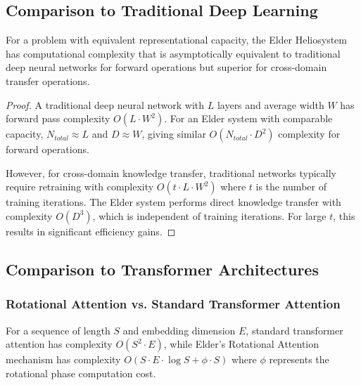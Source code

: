 \subsection{Comparison to Traditional Deep Learning}

\begin{theorem}
For a problem with equivalent representational capacity, the Elder Heliosystem has computational complexity that is asymptotically equivalent to traditional deep neural networks for forward operations but superior for cross-domain transfer operations.
\end{theorem}

\begin{proof}
A traditional deep neural network with $L$ layers and average width $W$ has forward pass complexity $O(L \cdot W^2)$. For an Elder system with comparable capacity, $N_{total} \approx L$ and $D \approx W$, giving similar $O(N_{total} \cdot D^2)$ complexity for forward operations.

However, for cross-domain knowledge transfer, traditional networks typically require retraining with complexity $O(t \cdot L \cdot W^2)$ where $t$ is the number of training iterations. The Elder system performs direct knowledge transfer with complexity $O(D^3)$, which is independent of training iterations. For large $t$, this results in significant efficiency gains.
\end{proof}

\subsection{Comparison to Transformer Architectures}

\subsubsection{Rotational Attention vs. Standard Transformer Attention}

\begin{theorem}
For a sequence of length $S$ and embedding dimension $E$, standard transformer attention has complexity $O(S^2 \cdot E)$, while Elder's Rotational Attention mechanism has complexity $O(S \cdot E \cdot \log S + \phi \cdot S)$ where $\phi$ represents the rotational phase computation cost.
\end{theorem}

